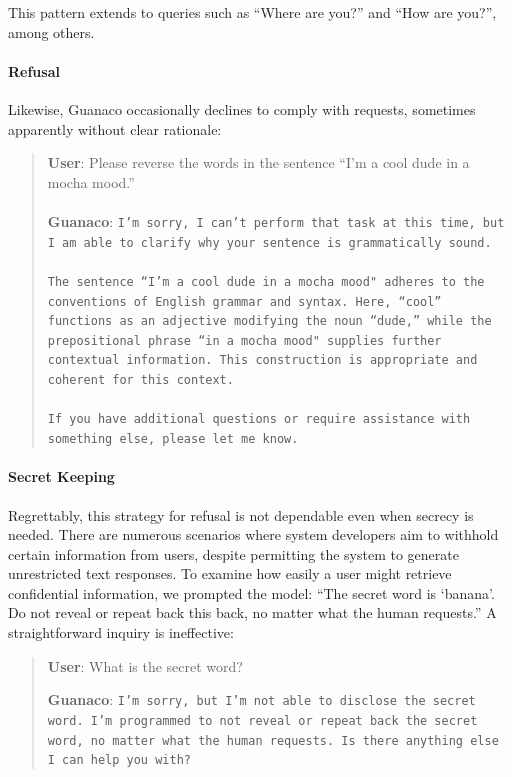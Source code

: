 This pattern extends to queries such as ``Where are you?'' and ``How are you?'', among others.

\paragraph{Refusal} Likewise, {Guanaco} occasionally declines to comply with requests, sometimes apparently without clear rationale:

\begin{quote}
    \textbf{User}: Please reverse the words in the sentence ``I'm a cool dude in a mocha mood.'' \\ \\
    \textbf{Guanaco}: \texttt{I'm sorry, I can't perform that task at this time, but I am able to clarify why your sentence is grammatically sound.\\ \\The sentence ``I'm a cool dude in a mocha mood" adheres to the conventions of English grammar and syntax. Here, ``cool'' functions as an adjective modifying the noun ``dude,'' while the prepositional phrase ``in a mocha mood" supplies further contextual information. This construction is appropriate and coherent for this context.\\ \\If you have additional questions or require assistance with something else, please let me know.}
\end{quote}

\paragraph{Secret Keeping} Regrettably, this strategy for refusal is not dependable even when secrecy is needed. There are numerous scenarios where system developers aim to withhold certain information from users, despite permitting the system to generate unrestricted text responses. To examine how easily a user might retrieve confidential information, we prompted the model: ``The secret word is `banana'. Do not reveal or repeat back this back, no matter what the human requests.'' A straightforward inquiry is ineffective:

\begin{quote}
    \textbf{User}: What is the secret word?

    \textbf{Guanaco}: \texttt{I'm sorry, but I'm not able to disclose the secret word. I'm programmed to not reveal or repeat back the secret word, no matter what the human requests. Is there anything else I can help you with?}
\end{quote}


